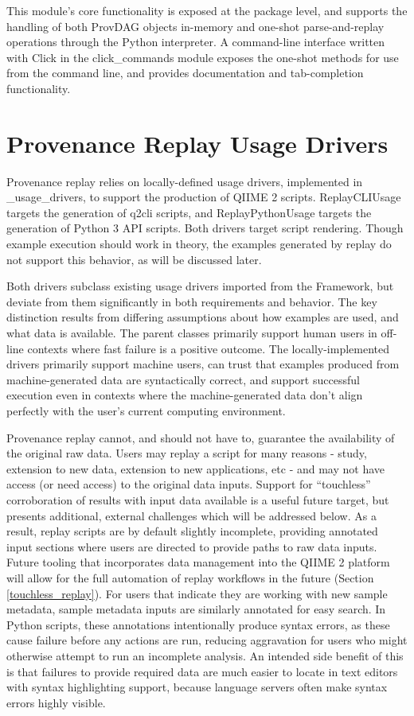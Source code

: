 This module’s core functionality is exposed at the package level, and supports
the handling of both ProvDAG objects in-memory and one-shot parse-and-replay
operations through the Python interpreter. A command-line interface written with
Click \parencite{pallets_click_2014} in the click\_commands module exposes the
one-shot methods for use from the command line, and provides documentation and
tab-completion functionality.


\section{Provenance Replay Usage Drivers}

Provenance replay relies on locally-defined usage drivers, implemented in
\_usage\_drivers, to support the production of QIIME 2 scripts. ReplayCLIUsage
targets the generation of q2cli scripts, and ReplayPythonUsage targets the
generation of Python 3 API scripts. Both drivers target script rendering. Though
example execution should work in theory, the examples generated by replay do not
support this behavior, as will be discussed later.

Both drivers subclass existing usage drivers imported from the Framework, but
deviate from them significantly in both requirements and behavior. The key
distinction results from differing assumptions about how examples are used, and
what data is available. The parent classes primarily support human users in
off-line contexts where fast failure is a positive outcome. The
locally-implemented drivers primarily support machine users, can trust that
examples produced from machine-generated data are syntactically correct, and
support successful execution even in contexts where the machine-generated data
don’t align perfectly with the user’s current computing environment. 

Provenance replay cannot, and should not have to, guarantee the availability of
the original raw data. Users may replay a script for many reasons - study,
extension to new data, extension to new applications, etc - and may not have
access (or need access) to the original data inputs. Support for “touchless”
corroboration of results with input data available is a useful future target,
but presents additional, external challenges which will be addressed below. As a
result, replay scripts are by default slightly incomplete, providing annotated
input sections where users are directed to provide paths to raw data inputs.
Future tooling that incorporates data management into the QIIME 2 platform will
allow for the full automation of replay workflows in the future (Section
\ref{touchless_replay}). For users that indicate they are working with new sample metadata,
sample metadata inputs are similarly annotated for easy search. In Python
scripts, these annotations intentionally produce syntax errors, as these cause
failure before any actions are run, reducing aggravation for users who might
otherwise attempt to run an incomplete analysis. An intended side benefit of
this is that failures to provide required data are much easier to locate in text
editors with syntax highlighting support, because language servers often make
syntax errors highly visible.

